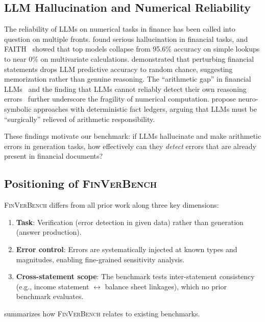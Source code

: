 \documentclass[11pt]{article}
\newcommand{\benchmark}{\textsc{FinVerBench}}
\begin{document}
\subsection{LLM Hallucination and Numerical Reliability}
\label{sec:related:hallucination}

The reliability of LLMs on numerical tasks in finance has been called into question on multiple fronts.
\citet{kang2023hallucination} found serious hallucination in financial tasks, and FAITH~\citep{zhang2025faith} showed that top models collapse from 95.6\% accuracy on simple lookups to near 0\% on multivariate calculations.
\citet{memorization2025} demonstrated that perturbing financial statements drops LLM predictive accuracy to random chance, suggesting memorization rather than genuine reasoning.
The ``arithmetic gap'' in financial LLMs~\citep{arithmeticgap2026} and the finding that LLMs cannot reliably detect their own reasoning errors~\citep{mathcomp2025} further underscore the fragility of numerical computation.
\citet{venra2026} propose neuro-symbolic approaches with deterministic fact ledgers, arguing that LLMs must be ``surgically'' relieved of arithmetic responsibility.

These findings motivate our benchmark: if LLMs hallucinate and make arithmetic errors in generation tasks, how effectively can they \emph{detect} errors that are already present in financial documents?

\subsection{Positioning of \benchmark{}}
\label{sec:related:positioning}

\benchmark{} differs from all prior work along three key dimensions:
\begin{enumerate}[topsep=2pt,itemsep=1pt]
    \item \textbf{Task}: Verification (error detection in given data) rather than generation (answer production).
    \item \textbf{Error control}: Errors are systematically injected at known types and magnitudes, enabling fine-grained sensitivity analysis.
    \item \textbf{Cross-statement scope}: The benchmark tests inter-statement consistency (e.g., income statement $\leftrightarrow$ balance sheet linkages), which no prior benchmark evaluates.
\end{enumerate}

 summarizes how \benchmark{} relates to existing benchmarks.
\end{document}
